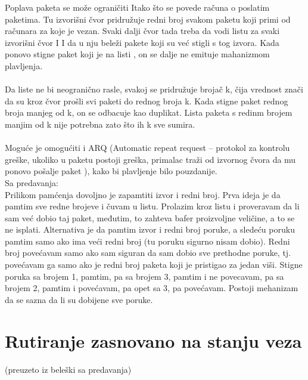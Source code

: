 \documentclass{article} %
\begin{document}
Poplava paketa se može ograničiti Itako što se povede računa o poslatim paketima. Tu izvorišni čvor pridružuje redni broj svakom paketu koji primi od računara za koje je vezan. Svaki dalji čvor tada treba da vodi listu za svaki izvorišni čvor I I da u nju beleži pakete koji su već stigli s tog izvora. Kada ponovo stigne paket koji je na listi , on se dalje ne emituje mahanizmom plavljenja.\\
\\
Da liste ne bi neogranično rasle, svakoj se pridružuje brojač k, čija vrednost znači da su kroz čvor prošli svi paketi do  rednog broja k. Kada stigne paket rednog broja manjeg od k, on se odbacuje kao duplikat. Lista paketa s redinm brojem manjim od k nije potrebna zato što ih k sve sumira.\\
\\
Moguće je omogućiti i ARQ (Automatic repeat request – protokol za kontrolu greške, ukoliko u paketu postoji greška, primalac traži od izvornog čvora da mu ponovo pošalje paket ), kako bi plavljenje bilo pouzdanije. \\


Sa predavanja:
\\
Prilikom pamćenja dovoljno je zapamtiti izvor i redni broj. Prva ideja je da pamtim sve redne brojeve i čuvam u listu. Prolazim kroz listu i proveravam da li sam već dobio taj paket, međutim, to zahteva bafer proizvoljne veličine, a to se ne isplati. Alternativa je da pamtim izvor i redni broj poruke, a sledeću poruku pamtim samo ako ima veći redni broj (tu poruku sigurno nisam dobio). Redni broj povećavam samo ako sam siguran da sam dobio sve prethodne poruke, tj. povećavam ga samo ako je redni broj paketa koji je pristigao za jedan viši. Stigne poruka sa brojem 1, pamtim, pa sa brojem 3, pamtim i ne povecavam, pa sa brojem 2, pamtim i povećavam, pa opet sa 3, pa povećavam. Postoji mehanizam da se sazna da li su dobijene sve poruke. 

\section{Rutiranje zasnovano na stanju veza}
(preuzeto iz beleški sa predavanja)\\
\end{document}
